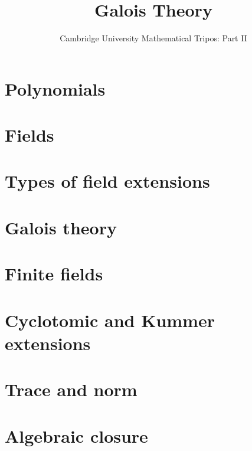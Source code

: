 \documentclass{article}
\title{Galois Theory}
\author{Cambridge University Mathematical Tripos: Part II}
\begin{document}
\maketitle

\tableofcontentsnewpage{}

\section{Polynomials}

\section{Fields}

\section{Types of field extensions}

\section{Galois theory}

\section{Finite fields}

\section{Cyclotomic and Kummer extensions}

\section{Trace and norm}

\section{Algebraic closure}

\end{document}
